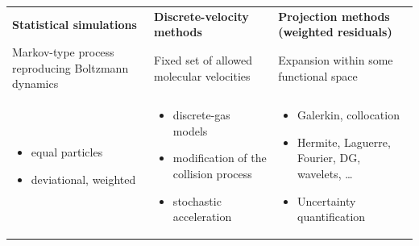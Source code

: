 \documentclass[mathserif]{beamer} %
\begin{document}
\begin{frame}
    \setlength{\leftmarginii}{10pt}
    \setlength{\leftmarginiii}{\leftmarginii}
    \begin{adjustwidth}{-2.5em}{-2.5em}
    \centering
    \begin{tabular}{p{}p{}p{}}
		\centering\bfseries Statistical simulations &
		\centering\bfseries Discrete-velocity methods &
		{\centering\bfseries Projection methods (weighted residuals)} \\[10pt]
        Markov-type process reproducing Boltzmann dynamics &
		Fixed set of allowed molecular velocities &
		Expansion within some functional space \\
   		\begin{itemize}
            \item equal particles
            \item deviational, weighted
        \end{itemize} &
		\begin{itemize}
            \item discrete-gas models
            \item modification of the collision process
            \item stochastic acceleration
        \end{itemize} &
		\begin{itemize}
            \item Galerkin, collocation
            \item Hermite, Laguerre, Fourier, DG, wavelets, \dots
            \item Uncertainty quantification
        \end{itemize}
	\end{tabular}
    \end{adjustwidth}
\end{frame}
\end{document}
